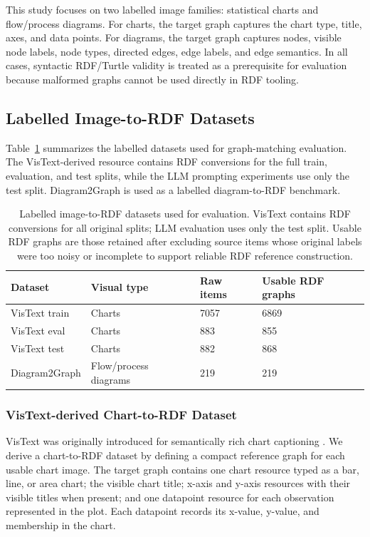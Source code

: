 \documentclass[preprint,12pt]{elsarticle}
\begin{document}
This study focuses on two labelled image families: statistical charts and flow/process diagrams. For charts, the target graph captures the chart type, title, axes, and data points. For diagrams, the target graph captures nodes, visible node labels, node types, directed edges, edge labels, and edge semantics. In all cases, syntactic RDF/Turtle validity is treated as a prerequisite for evaluation because malformed graphs cannot be used directly in RDF tooling.

\subsection{Labelled Image-to-RDF Datasets}\label{subsec:datasets}

Table~\ref{tab:dataset_overview} summarizes the labelled datasets used for graph-matching evaluation. The VisText-derived resource contains RDF conversions for the full train, evaluation, and test splits, while the LLM prompting experiments use only the test split. Diagram2Graph is used as a labelled diagram-to-RDF benchmark.

\begin{table}[ht]
\centering
\small
\begin{tabular}{llll}
\toprule
\textbf{Dataset} & \textbf{Visual type} & \textbf{Raw items} & \textbf{Usable RDF graphs} \\
\midrule
VisText train & Charts & 7057 & 6869 \\
VisText eval & Charts & 883 & 855 \\
VisText test & Charts & 882 & 868 \\
Diagram2Graph & Flow/process diagrams & 219 & 219 \\
\bottomrule
\end{tabular}
\caption{Labelled image-to-RDF datasets used for evaluation. VisText contains RDF conversions for all original splits; LLM evaluation uses only the test split. Usable RDF graphs are those retained after excluding source items whose original labels were too noisy or incomplete to support reliable RDF reference construction.}
\label{tab:dataset_overview}
\end{table}

\subsubsection{VisText-derived Chart-to-RDF Dataset}
VisText was originally introduced for semantically rich chart captioning \citep{vistext}. We derive a chart-to-RDF dataset by defining a compact reference graph for each usable chart image. The target graph contains one chart resource typed as a bar, line, or area chart; the visible chart title; x-axis and y-axis resources with their visible titles when present; and one datapoint resource for each observation represented in the plot. Each datapoint records its x-value, y-value, and membership in the chart.
\end{document}
